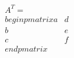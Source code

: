 \documentclass[preview]{standalone}
\begin{document}
\begin{align*}
A^T = \\begin{pmatrix} a & d \\ b & e \\ c & f \\end{pmatrix}
\end{align*}
\end{document}
